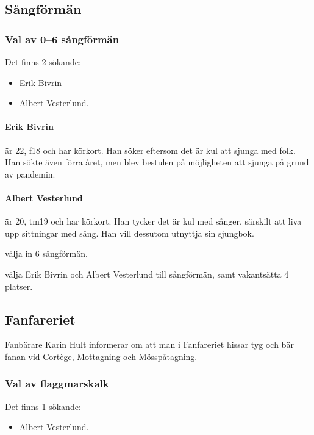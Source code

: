 \documentclass[hidelinks]{sektionsmote}
\begin{document}
\subsection{Sångförmän}
\subsubsection{Val av 0--6 sångförmän}
Det finns 2 sökande:
\begin{itemize}
    \item Erik Bivrin
    \item Albert Vesterlund.
\end{itemize}

\paragraph{Erik Bivrin} är 22, f18 och har körkort.
Han söker eftersom det är kul att sjunga med folk.
Han sökte även förra året, men blev bestulen på möjligheten att sjunga på grund av pandemin.

\paragraph{Albert Vesterlund} är 20, tm19 och har körkort.
Han tycker det är kul med sånger, särskilt att liva upp sittningar med sång.
Han vill dessutom utnyttja sin sjungbok.

\begin{beslut}
  \item välja in 6 sångförmän.
  \item välja Erik Bivrin och Albert Vesterlund till sångförmän, samt vakantsätta 4 platser.
\end{beslut}


\subsection{Fanfareriet}
Fanbärare Karin Hult informerar om att man i Fanfareriet hissar tyg och bär fanan vid Cortège, Mottagning och Mösspåtagning.

\subsubsection{Val av flaggmarskalk}
Det finns 1 sökande:
\begin{itemize}
    \item Albert Vesterlund.
\end{itemize}
\end{document}
